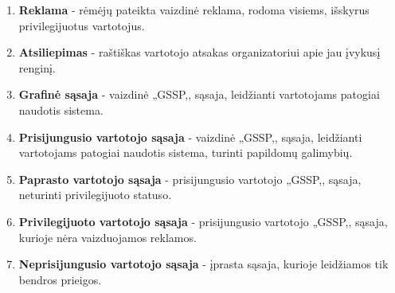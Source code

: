 \documentclass{VUMIFPSkursinis}
\begin{document}
\begin{enumerate}[label=\textbf{E\arabic*.}]
				\item \textbf{Reklama} - rėmėjų pateikta vaizdinė reklama, rodoma visiems, išskyrus privilegijuotus vartotojus.
				\item \textbf{Atsiliepimas} - raštiškas vartotojo atsakas organizatoriui apie jau įvykusį renginį.
				\item \textbf{Grafinė sąsaja} - vaizdinė „GSSP,, sąsaja, leidžianti vartotojams patogiai naudotis sistema.
				\item \textbf{Prisijungusio vartotojo sąsaja} - vaizdinė „GSSP,, sąsaja, leidžianti vartotojams patogiai naudotis sistema, turinti papildomų galimybių.
				\item \textbf{Paprasto vartotojo sąsaja} - prisijungusio vartotojo „GSSP,, sąsaja, neturinti privilegijuoto statuso.
				\item \textbf{Privilegijuoto vartotojo sąsaja} - prisijungusio vartotojo „GSSP,, sąsaja, kurioje nėra vaizduojamos reklamos.
				\item \textbf{Neprisijungusio vartotojo sąsaja} - įprasta sąsaja, kurioje leidžiamos tik bendros prieigos.	
            \end{enumerate}
\end{document}
